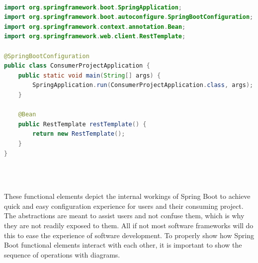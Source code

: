 {\begin{lstlisting}[language=Java, caption=Consumer Project creating pre-defined beans using SpringBootConfiguration]

import org.springframework.boot.SpringApplication;
import org.springframework.boot.autoconfigure.SpringBootConfiguration;
import org.springframework.context.annotation.Bean;
import org.springframework.web.client.RestTemplate;

@SpringBootConfiguration
public class ConsumerProjectApplication {
    public static void main(String[] args) {
        SpringApplication.run(ConsumerProjectApplication.class, args);
    }
    
    @Bean
    public RestTemplate restTemplate() {
        return new RestTemplate();
    }
}
\end{lstlisting}\ \\

\noindent\makebox[\linewidth]{\rule{\textwidth}{3pt}}
}\ \\

These functional elements depict the internal workings of Spring Boot to achieve quick and easy configuration experience for users and their consuming project. The abstractions are meant to assist users and not confuse them, which is why they are not readily exposed to them. All if not most software frameworks will do this to ease the experience of software development. To properly show how Spring Boot functional elements interact with each other, it is important to show the sequence of operations with diagrams.

